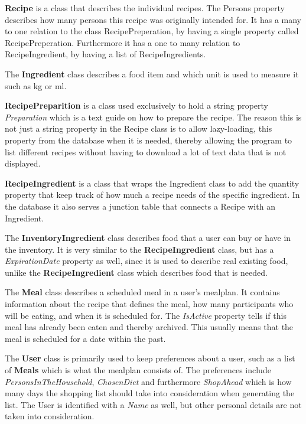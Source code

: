 \textbf{Recipe} is a class that describes the individual recipes. The Persons property describes how many persons this recipe was originally intended for. It has a many to one relation to the class RecipePreperation, by having a single property called RecipePreperation. Furthermore it has a one to many relation to RecipeIngredient, by having a list of RecipeIngredients.

The \textbf{Ingredient} class describes a food item and which unit is used to measure it such as kg or ml.

\textbf{RecipePreparition} is a class used exclusively to hold a string property \textit{Preparation} which is a text guide on how to prepare the recipe. The reason this is not just a string property in the Recipe class is to allow lazy-loading, this property from the database when it is needed, thereby allowing the program to list different recipes without having to download a lot of text data that is not displayed.

\textbf{RecipeIngredient} is a class that wraps the Ingredient class to add the quantity property that keep track of how much a recipe needs of the specific ingredient. In the database it also serves a junction table that connects a Recipe with an Ingredient.

The \textbf{InventoryIngredient} class describes food that a user can buy or have in the inventory. It is very similar to the \textbf{RecipeIngredient} class, but has a \textit{ExpirationDate} property as well, since it is used to describe real existing food, unlike the \textbf{RecipeIngredient} class which describes food that is needed.

The \textbf{Meal} class describes a scheduled meal in a user's mealplan. It contains information about the recipe that defines the meal, how many participants who will be eating, and when it is scheduled for. The \textit{IsActive} property tells if this meal has already been eaten and thereby archived. This usually means that the meal is scheduled for a date within the past.

The \textbf{User} class is primarily used to keep preferences about a user, such as a list of \textbf{Meals} which is what the mealplan consists of. The preferences include \textit{PersonsInTheHousehold}, \textit{ChosenDiet} and furthermore \textit{ShopAhead} which is how many days the shopping list should take into consideration when generating the list. The User is identified with a \textit{Name} as well, but other personal details are not taken into consideration.

